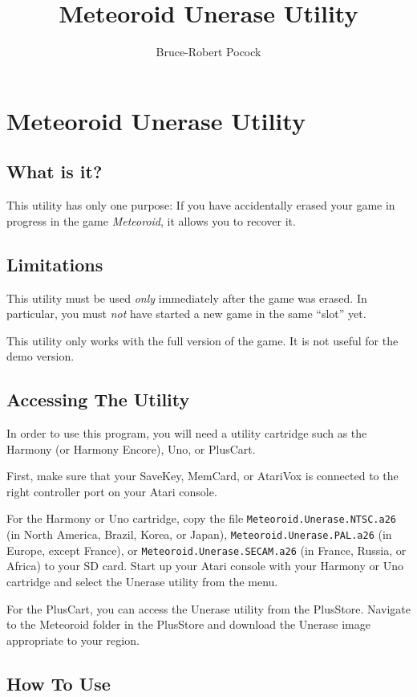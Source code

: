 \documentclass[article]{memoir}
\title{Meteoroid Unerase Utility}
\author{Bruce-Robert Pocock}
\begin{document}
\chapter*{Meteoroid Unerase Utility}

\section*{What is it?}

This utility has only one purpose:  If you have accidentally erased your
game  in progress  in  the  game \textit{Meteoroid},  it  allows you  to
recover it.

\section*{Limitations}

This  utility must  be  used \textit{only}  immediately  after the  game
was erased. In particular, you must \textit{not} have started a new game
in the same ``slot'' yet.

This utility  only works with  the full version of  the game. It  is not
useful for the demo version.

\section*{Accessing The Utility}

In order to use this program, you  will need a utility cartridge such as
the Harmony (or Harmony Encore), Uno, or PlusCart.

First, make sure that your SaveKey, MemCard, or AtariVox is connected to
the right controller port on your Atari console.

For    the    Harmony    or     Uno    cartridge,    copy    the    file
\texttt{Meteoroid.Unerase.NTSC.a26} (in North America, Brazil, Korea, or
Japan), \texttt{Meteoroid.Unerase.PAL.a26}  (in Europe,  except France),
or \texttt{Meteoroid.Unerase.SECAM.a26}  (in France, Russia,  or Africa)
to your SD  card. Start up your  Atari console with your  Harmony or Uno
cartridge and select the Unerase utility from the menu.

For the PlusCart, you can access the Unerase utility from the PlusStore.
Navigate  to the  Meteoroid folder  in  the PlusStore  and download  the
Unerase image appropriate to your region.

\clearpage

\section*{How To Use}
\end{document}

